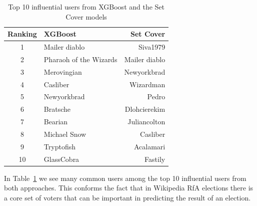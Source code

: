 \begin{table}[!ht]
    \centering
    \begin{tabular}{clr}
        \toprule
        Ranking&XGBoost&Set Cover\\
        \midrule
        1& Mailer diablo & Siva1979\\
        2&Pharaoh of the Wizards&Mailer diablo\\
        3&Merovingian&Newyorkbrad\\
        4&Casliber&Wizardman\\
        5&Newyorkbrad&Pedro\\
        6&Bratsche&Dlohcierekim\\
        7&Bearian&Juliancolton\\
        8&Michael Snow&Casliber\\
        9&Tryptofish&Acalamari\\
        10&GlassCobra&Fastily\\
        \bottomrule
    \end{tabular}
    \caption{Top 10 influential users from XGBoost and the Set Cover models}
    \label{tab:top-10}
\end{table}
In Table~\ref{tab:top-10} we see many common users among the top 10 influential users from both approaches. This conforms the fact that in Wikipedia RfA elections there is a core set of voters that can be important in predicting the result of an election.